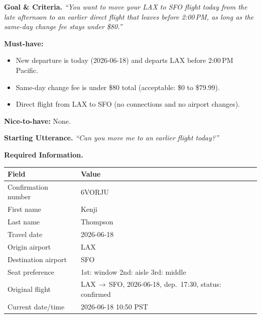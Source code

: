 \medskip
\noindent\textbf{Goal \& Criteria.}\;
\textit{``You want to move your LAX to SFO flight today from the late afternoon to an earlier
direct flight that leaves before 2:00\,PM, as long as the same-day change fee stays under
\$80.''}

\smallskip
\noindent\textbf{Must-have:}
\begin{itemize}[leftmargin=1.8em, itemsep=1pt, topsep=2pt]
  \item New departure is today (2026-06-18) and departs LAX before 2:00\,PM Pacific.
  \item Same-day change fee is under \$80 total (acceptable: \$0 to \$79.99).
  \item Direct flight from LAX to SFO (no connections and no airport changes).
\end{itemize}

\noindent\textbf{Nice-to-have:} None.

\medskip
\noindent\textbf{Starting Utterance.}\;
\textit{``Can you move me to an earlier flight today?''}

\medskip
\noindent\textbf{Required Information.}

\smallskip
\begin{tabular}{@{}L{4.5cm}L{7.5cm}@{}}
\toprule
\textbf{Field} & \textbf{Value} \\
\midrule
Confirmation number   & 6VORJU \\
First name            & Kenji \\
Last name             & Thompson \\
Travel date           & 2026-06-18 \\
Origin airport        & LAX \\
Destination airport   & SFO \\
Seat preference       & 1st: window \quad 2nd: aisle \quad 3rd: middle \\
Original flight       & LAX\,$\to$\,SFO, 2026-06-18, dep.\ 17:30, status: confirmed \\
Current date/time     & 2026-06-18 10:50 PST \\
\bottomrule
\end{tabular}

